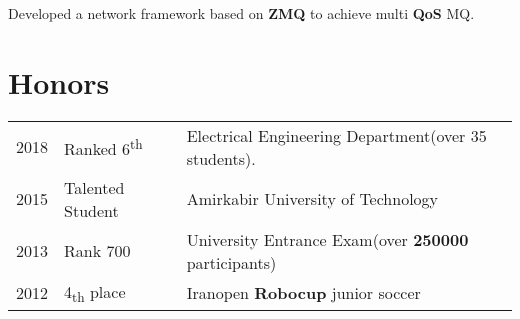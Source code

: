 \documentclass[]{plushcv}
\begin{document}
\begin{minipage}[t]{0.70\textwidth}
\begin{tightemize}
	\item Developed a network framework based on \textbf{ZMQ} to achieve multi \textbf{QoS} MQ.
\end{tightemize}


\section{Honors} 
\begin{tabular}{rll}
2018	     & Ranked 6\textsuperscript{th}  & Electrical Engineering Department(over 35 students).\\
2015	     & Talented Student & Amirkabir University of Technology \\
2013        &  Rank 700  & University Entrance Exam(over \textbf{250000} participants) \\
2012        & 4\textsubscript{th} place & Iranopen \textbf{Robocup} junior soccer
\end{tabular}
%
%

\end{minipage} 
\hfill
\end{document}
